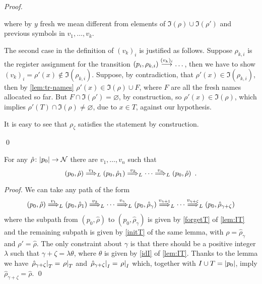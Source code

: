 \begin{proof}
\begin{enumerate}
where by $y$ fresh we mean different from elements of $\Im(\rho) \cup \Im(\rho')$ and previous symbols in $v_1,\dots,v_{k}$.

The second case in the definition of $(v_k)_i$ is justified as follows. Suppose $\rho_{k,i}$ is the register assignment for the transition $(p_i,\rho_{k,i}) \overset{(v_k)_i}{\longrightarrow} \dots$, then we have to show $(v_k)_i = \rho'(x) \notin \Im(\rho_{k,i})$. Suppose, by contradiction, that $\rho'(x) \in \Im(\rho_{k,i})$, then by \cref{lem:tr-names} $\rho'(x) \in \Im(\rho) \cup F$, where $F$ are all the fresh names allocated so far. But $F \cap \Im(\rho') = \varnothing$, by construction, so $\rho'(x) \in \Im(\rho)$, which implies $\rho'(T) \cap \Im(\rho) \neq \varnothing$, due to $x \in T$, against our hypothesis.

It is easy to see that $\rho_\zeta$ satisfies the statement by construction.

\end{enumerate}
\qed
\end{proof}


\newcommand{\rrho}{\hat \rho}
\begin{proposition}
\label{prop:loop}

For any $\hat{\rho} \colon |p_0| \to \mathcal{N}$ there are $v_1,\dots,v_n$ such that
\[
	(p_0, \rrho) \TrP{v_1}{L} (p_0, \rrho_1) \TrP{v_2}{L} \cdots \TrP{v_n}{L} (p_0,\rrho) \enspace .
\]
\end{proposition}

\begin{proof}
We can take any path of the form
\[
	(p_0,\rrho) \TrP{v_1}{L} (p_0,\rrho_1) \TrP{v_2}{L} \cdots \TrP{v_{\gamma}}{L} (p_0,\rrho_\gamma) \TrP{v_{\gamma+1}}{L} \cdots \TrP{v_{\gamma + \zeta}}{L} (p_0,\rrho_{\gamma + 
	 \zeta})
\]
where the subpath from $(p_0,\rrho)$ to $(p_0,\rrho_\gamma)$ is given by \ref{forgetT} of \cref{lem:IT} and the remaining subpath is given by \ref{initT} of the same lemma, with $\rho = \rrho_\gamma$ and $\rho' = \rrho$. The only constraint about $\gamma$ is that there should be a positive integer $\lambda$ such that $\gamma + \zeta = \lambda \theta$, where $\theta$ is given by \ref{idI} of \cref{lem:IT}. Thanks to the lemma we have $\restr{\rrho_{\gamma + \zeta}}{T} = \restr{\rho}{T}$ and 
$\restr{\rrho_{\gamma + \zeta}}{I} = \restr{\rho}{I}$ which, together with $I \cup T = |p_0|$, imply $\rrho_{\gamma + \zeta} = \rrho$.
\qed
\end{proof}


